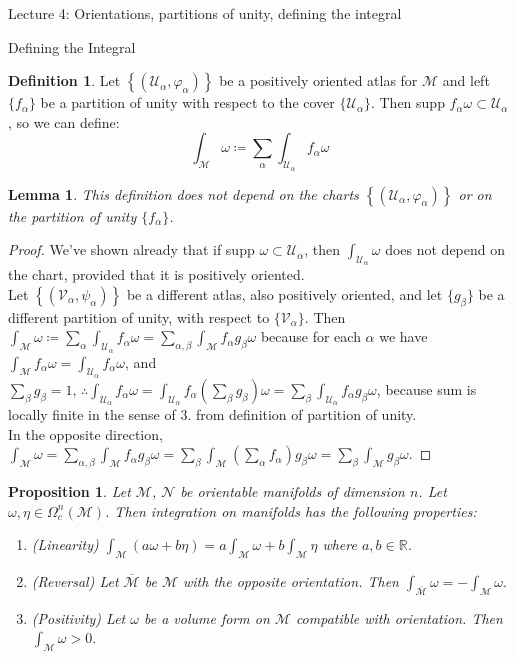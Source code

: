 \documentclass[10pt]{article}
\theoremstyle{plain}
\newtheorem{lemma}[thm]{Lemma}
\newtheorem{prop}[thm]{Proposition}
\theoremstyle{definition}
\newtheorem{defn}[thm]{Definition} %
\newcommand{\Real}{\mathbb{R}}
\newcommand{\man}{\mathcal{M}}
\newcommand{\nan}{\mathcal{N}}
\newcommand{\chartU}{\mathcal{U}}
\newcommand{\chartV}{\mathcal{V}}
\newcommand{\chart}{\varphi}
\newcommand{\varchart}{\psi}
\newcommand{\alphaatlas}{\left\{(\chartU_\alpha,\chart_\alpha)\right\}}
\newcommand{\varalphaatlas}{\left\{(\chartV_\alpha,\varchart_\alpha)\right\}}
\newcommand{\compactpformman}[1]{\Omega^{#1}_c(\man)}
\newcommand{\sumfromto}[2]{\sum\limits_{#1}^{#2}}
\begin{document}
\begin{section}{Lecture 4: Orientations, partitions of unity, defining the integral}
\begin{subsection}{Defining the Integral}
\begin{defn}
Let $\alphaatlas$ be a positively oriented atlas for $\man$ and left $\{f_\alpha\}$ be a partition of unity with respect to the cover $\{\chartU_\alpha\}$. Then supp $f_\alpha \omega \subset  \chartU_\alpha$, so we can define:
$$\int_\man \omega \coloneqq \sumfromto{\alpha}{} \int_{\chartU_\alpha} f_\alpha \omega$$
\end{defn}
\begin{lemma}
This definition does not depend on the charts $\alphaatlas$ or on the partition of unity $\{f_\alpha\}$.
\end{lemma}
\begin{proof}
We've shown already that if supp $\omega \subset \chartU_\alpha$, then $\int_{\chartU_\alpha} \omega$ does not depend on the chart, provided that it is positively oriented. \\
Let $\varalphaatlas$ be a different atlas, also positively oriented, and let $\{g_\beta\}$ be a different partition of unity, with respect to $\{\chartV_\alpha\}$. Then $\int_\man \omega \coloneqq \sumfromto{\alpha}{} \int_{\chartU_\alpha} f_\alpha \omega = \sumfromto{\alpha,\beta}{} \int_{\man} f_\alpha g_\beta \omega$ because for each $\alpha$ we have $\int_\man f_\alpha \omega = \int_{\chartU_\alpha}f_\alpha \omega$, and $\sumfromto{\beta}{} g_\beta = 1, \,\therefore  \int_{\chartU_\alpha}f_\alpha \omega =  \int_{\chartU_\alpha}f_\alpha (\sumfromto{\beta}{}g_\beta)\omega = \sumfromto{\beta}{}\int_{\chartU_\alpha}f_\alpha g_\beta \omega$, because sum is locally finite in the sense of 3. from definition of partition of unity.\\
In the opposite direction, $\int_\man \omega = \sumfromto{\alpha,\beta}{~}  \int_\man f_\alpha g_\beta \omega = \sumfromto{\beta}{} \int_\man (\sumfromto{\alpha}{}f_\alpha )g_\beta \omega = \sumfromto{\beta}{}\int_\man g_\beta \omega$.
\end{proof}
\begin{prop}
Let $\man$, $\nan$ be orientable manifolds of dimension $n$. Let $\omega, \eta \in \compactpformman{n}$. Then integration on manifolds has the following properties:
\begin{enumerate}
    \item (Linearity) $\int_\man (a \omega + b\eta) = a \int_\man \omega  + b \int_\man \eta$ where $a,b \in \Real$.
    \item (Reversal) Let $\overline{\man}$ be $\man$ with the opposite orientation. Then $\int_{\overline{\man}}\omega=-\int_{\man}\omega.$
    \item (Positivity) Let $\omega$ be a volume form on $\man$ compatible with orientation. Then $\int_\man \omega > 0.$

\end{enumerate}
\end{prop}
\end{subsection}
\end{section}
\end{document}
